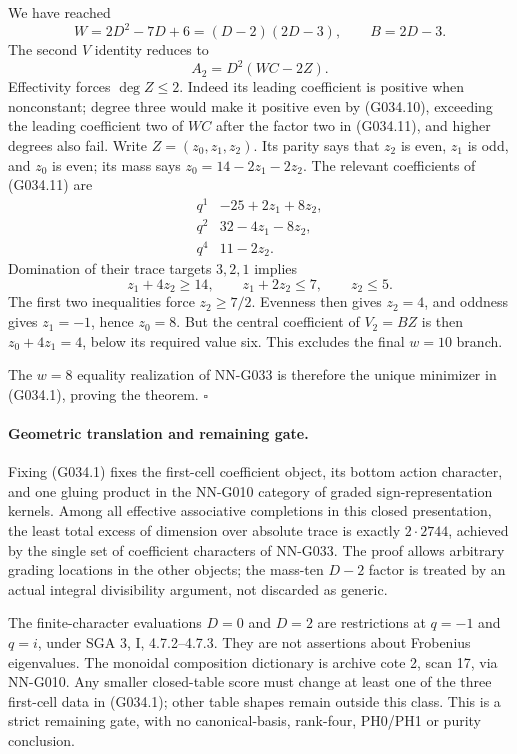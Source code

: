We have reached
\[
 W=2D^2-7D+6=(D-2)(2D-3),\qquad B=2D-3.
\]
The second $V$ identity reduces to
\[
                    A_2=D^2(WC-2Z).                 \tag{G034.11}
\]
Effectivity forces $\deg Z\le2$. Indeed its leading
coefficient is positive when nonconstant; degree three
would make it positive even by (G034.10), exceeding
the leading coefficient two of $WC$ after the factor
two in (G034.11), and higher degrees also fail.
Write $Z=(z_0,z_1,z_2)$. Its parity says that $z_2$
is even, $z_1$ is odd, and $z_0$ is even; its mass says
$z_0=14-2z_1-2z_2$.
The relevant coefficients of (G034.11) are
\[
 \begin{array}{c|l}
 q^1&-25+2z_1+8z_2,\\
 q^2&32-4z_1-8z_2,\\
 q^4&11-2z_2.
 \end{array}
\]
Domination of their trace targets $3,2,1$ implies
\[
 z_1+4z_2\ge14,\qquad z_1+2z_2\le7,\qquad z_2\le5.
\]
The first two inequalities force $z_2\ge7/2$.
Evenness then gives $z_2=4$, and oddness gives
$z_1=-1$, hence $z_0=8$.
But the central coefficient of $V_2=BZ$ is then
$z_0+4z_1=4$, below its required value six.
This excludes the final $w=10$ branch.

The $w=8$ equality realization of NN-G033 is therefore
the unique minimizer in (G034.1), proving the theorem.
\hfill$\square$

\paragraph{Geometric translation and remaining gate.}
Fixing (G034.1) fixes the first-cell coefficient object,
its bottom action character, and one gluing product in
the NN-G010 category of graded sign-representation kernels.
Among all effective associative completions in this closed
presentation, the least total excess of dimension over
absolute trace is exactly $2\cdot2744$, achieved by the
single set of coefficient characters of NN-G033.
The proof allows arbitrary grading locations in the other
objects; the mass-ten $D-2$ factor is treated by an actual
integral divisibility argument, not discarded as generic.

The finite-character evaluations $D=0$ and $D=2$
are restrictions at $q=-1$ and $q=i$, under SGA 3,
I, 4.7.2--4.7.3. They are not assertions about Frobenius
eigenvalues. The monoidal composition dictionary is
archive cote 2, scan 17, via NN-G010.
Any smaller closed-table score must change at least one
of the three first-cell data in (G034.1); other table
shapes remain outside this class. This is a strict
remaining gate, with no canonical-basis, rank-four,
PH0/PH1 or purity conclusion.




